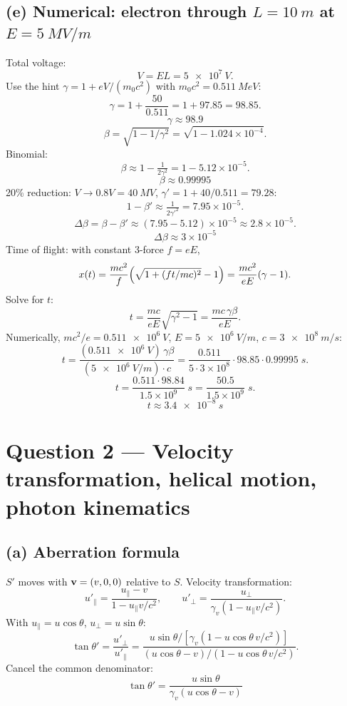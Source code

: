 \documentclass[11pt]{article}
\begin{document}
\subsection*{(e) Numerical: electron through $L=\SI{10}{m}$ at $E=\SI{5}{MV/m}$}

Total voltage:
\[ V = E L = \SI{5e7}{V}. \]
Use the hint $\gamma = 1 + eV/(m_0 c^2)$ with $m_0 c^2 = \SI{0.511}{MeV}$:
\[ \gamma = 1 + \frac{50}{0.511} = 1 + 97.85 = 98.85. \]
\[ \boxed{\;\gamma \approx 98.9\;} \]
\[ \beta = \sqrt{1 - 1/\gamma^2} = \sqrt{1 - 1.024\times 10^{-4}}. \]
Binomial:
\[ \beta \approx 1 - \tfrac{1}{2\gamma^2} = 1 - 5.12\times 10^{-5}. \]
\[ \boxed{\;\beta \approx 0.99995\;} \]
20\% reduction: $V\to 0.8 V = \SI{40}{MV}$, $\gamma' = 1 + 40/0.511 = 79.28$:
\[ 1-\beta' \approx \tfrac{1}{2\gamma'^2} = 7.95\times 10^{-5}. \]
\[ \Delta\beta = \beta - \beta' \approx (7.95 - 5.12)\times 10^{-5} \approx 2.8\times 10^{-5}. \]
\[ \boxed{\;\Delta\beta \approx 3\times 10^{-5}\;} \]
Time of flight: with constant 3-force $f = eE$,
\[ x(t) = \frac{mc^2}{f}\Bigl(\sqrt{1+(ft/mc)^2}-1\Bigr) = \frac{mc^2}{eE}(\gamma-1). \]
Solve for $t$:
\[ t = \frac{mc}{eE}\sqrt{\gamma^2-1} = \frac{mc\,\gamma\beta}{eE}. \]
Numerically, $mc^2/e = \SI{0.511e6}{V}$, $E = \SI{5e6}{V/m}$, $c=\SI{3e8}{m/s}$:
\[ t = \frac{(\SI{0.511e6}{V})\,\gamma\beta}{(\SI{5e6}{V/m})\cdot c} = \frac{0.511}{5\cdot 3\times 10^{8}}\cdot 98.85\cdot 0.99995\;\si{s}. \]
\[ t = \frac{0.511\cdot 98.84}{1.5\times 10^{9}}\;\si{s} = \frac{50.5}{1.5\times 10^{9}}\;\si{s}. \]
\[ \boxed{\;t \approx \SI{3.4e-8}{s}\;} \]

\section*{Question 2 --- Velocity transformation, helical motion, photon kinematics}

\subsection*{(a) Aberration formula}

$S'$ moves with $\vb v = (v,0,0)$ relative to $S$. Velocity transformation:
\[ u'_\| = \frac{u_\|-v}{1 - u_\| v/c^2}, \qquad u'_\perp = \frac{u_\perp}{\gamma_v(1 - u_\| v/c^2)}. \]
With $u_\| = u\cos\theta$, $u_\perp = u\sin\theta$:
\[ \tan\theta' = \frac{u'_\perp}{u'_\|} = \frac{u\sin\theta/[\gamma_v(1-u\cos\theta\,v/c^2)]}{(u\cos\theta - v)/(1-u\cos\theta\,v/c^2)}. \]
Cancel the common denominator:
\[ \boxed{\;\tan\theta' = \frac{u\sin\theta}{\gamma_v(u\cos\theta - v)}\;} \]
\end{document}
